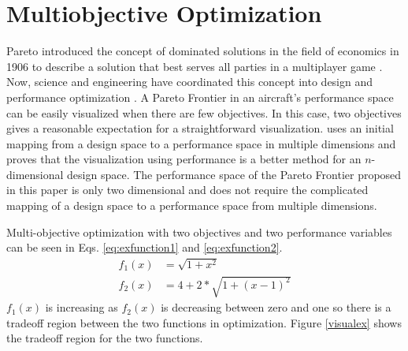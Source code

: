 \section{Multiobjective Optimization}
Pareto introduced the concept of dominated solutions in the field of economics in 1906 to describe a solution that best serves all parties in a multiplayer game \cite{paretomanual}. Now, science and engineering have coordinated this concept into design and performance optimization \cite{surveyMarler}. A Pareto Frontier in an aircraft's performance space can be easily visualized when there are few objectives. In this case, two objectives gives a reasonable expectation for a straightforward visualization. \cite{MultiobjectiveVisualization} uses an initial mapping from a design space to a performance space in multiple dimensions and proves that the visualization using performance is a better method for an $n$-dimensional design space. The performance space of the Pareto Frontier proposed in this paper is only two dimensional and does not require the complicated mapping of a design space to a performance space from multiple dimensions.\par
Multi-objective optimization with two objectives and two performance variables can be seen in Eqs. \ref{eq:exfunction1} and \ref{eq:exfunction2}.
\begin{align}
    f_1(x) &= \sqrt{1+x^2}\label{eq:exfunction1}\\
    f_2(x) &= 4+2*\sqrt{1+(x-1)^2}
    \label{eq:exfunction2}
\end{align}
$f_1(x)$ is increasing as $f_2(x)$ is decreasing between zero and one so there is a tradeoff region between the two functions in optimization. Figure \ref{visualex} shows the tradeoff region for the two functions.

